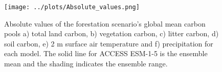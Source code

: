 \documentclass[]{article}
\begin{document}
\begin{figure}[H]
    \centering
    \texttt{[image: ../plots/Absolute\_values.png]}
    \caption{Absolute values of the forestation scenario's global mean carbon pools a) total land carbon, b) vegetation carbon, c) litter carbon, d) soil carbon, e) 2 m surface air temperature and f) precipitation for each model. The solid line for ACCESS ESM-1-5 is the ensemble mean and the shading indicates the ensemble range.}
    \label{fig:models_absolute}
\end{figure}
\end{document}
